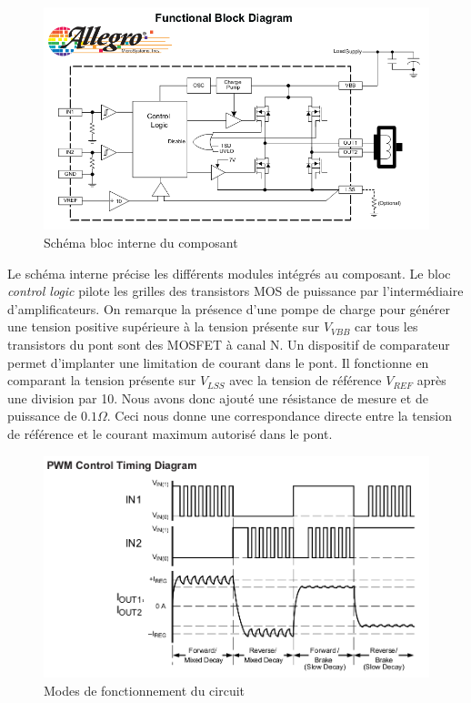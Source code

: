 \documentclass[11pt, french]{article} %
\begin{document}
\begin{figure}[h!]
	\centering
	\includegraphics[width = 15cm]{SolutionAnalogique/A4950.png} 
	\caption{Schéma bloc interne du composant}
\end{figure}

\medskip
Le schéma interne précise les différents modules intégrés au composant. Le bloc \emph{control logic} pilote les grilles des transistors MOS de puissance par l'intermédiaire d'amplificateurs. On remarque la présence d'une pompe de charge pour générer une tension positive supérieure à la tension présente sur $ V_{VBB} $ car tous les transistors du pont sont des MOSFET à canal N. Un dispositif de comparateur permet d'implanter une limitation de courant dans le pont. Il fonctionne en comparant la tension présente sur $ V_{LSS} $ avec la tension de référence $ V_{REF} $ après une division par 10. Nous avons donc ajouté une résistance de mesure et de puissance de $ 0.1 \Omega $. Ceci nous donne une correspondance directe entre la tension de référence et le courant maximum autorisé dans le pont.

\begin{figure}[h!]
	\centering
	\includegraphics[width = 15cm]{SolutionAnalogique/PWMtimings.png} 
	\caption{Modes de fonctionnement du circuit}
\end{figure}
\end{document}
